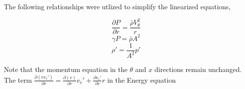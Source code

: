 


The following relationships were utlized to simplify the linearized equations,

\[\frac{\partial P}{\partial r} = \frac{\bar{\rho} V_{\theta}^2}{r} \]
\[\gamma P  = \bar{\rho}A^2\]
\[\rho' = \frac{1}{A^2} p'\]

Note that the momentum equation in the $\theta$ and $x$ directions remain 
unchanged. The term $ \frac{\partial(rv_r')}{\partial r}  =%
\frac{\partial (r)}{\partial r}v_r' + \frac{\partial v_r'}{\partial r} r$ 
in the Energy equation


